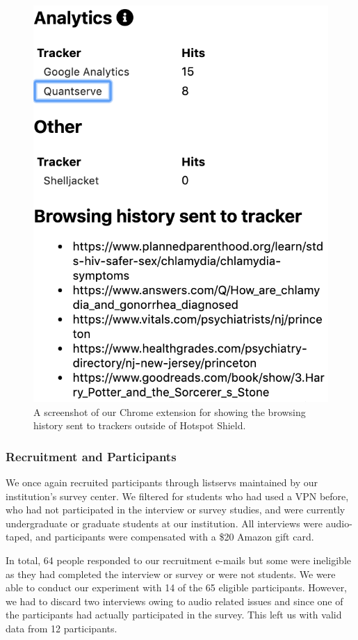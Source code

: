 \begin{figure}[t]
    \includegraphics[width=0.85\linewidth]{sections/figures/vpn-audit.png}
    \caption{A screenshot of our Chrome extension for showing the browsing history sent to trackers outside of Hotspot Shield.}
    \label{fig:vpn-audit}
\end{figure}


\subsubsection{Recruitment and Participants} 

We once again recruited participants through listservs maintained by our
institution's survey center.  We filtered for students who had used a VPN
before, who had not participated in the interview or survey studies, and were
currently undergraduate or graduate students at our institution.  All
interviews were audio-taped, and participants were compensated with a \$20
Amazon gift card.

In total, 64 people responded to our recruitment e-mails but some were
ineligible as they had completed the interview or survey or were not students.
We were able to conduct our experiment with 14 of the 65 eligible
participants.  However, we had to discard two interviews owing to audio
related issues and since one of the participants had actually participated in
the survey.  This left us with valid data from 12 participants.

